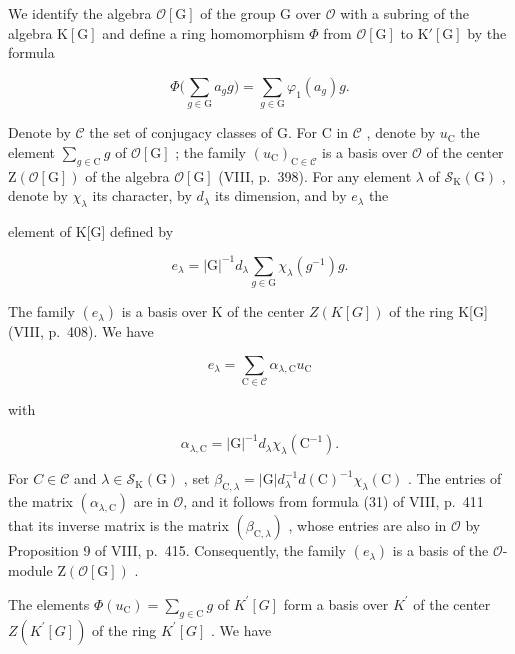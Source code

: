 We identify the algebra \(\mathcal{O}[\mathrm{G}]\) of the group \(\mathrm{G}\) over \(\mathcal{O}\) with a subring of the algebra \(\mathrm{K}[\mathrm{G}]\) and define a ring homomorphism \(\Phi\) from \(\mathcal{O}[\mathrm{G}]\) to \(\mathrm{K}'[\mathrm{G}]\) by the formula

\[
\Phi \bigg (\sum_ {g \in \mathrm{G}} a _ {g} g \bigg) = \sum_ {g \in \mathrm{G}} \varphi_ {1} (a _ {g}) g.\tag{42}
\]

Denote by \(\mathcal{C}\) the set of conjugacy classes of G. For C in \(\mathcal{C}\) , denote by \(u_{\mathrm{C}}\) the element \(\sum_{g\in \mathrm{C}}g\) of \(\mathcal{O}[\mathrm{G}]\) ; the family \((u_{\mathrm{C}})_{\mathrm{C}\in \mathcal{C}}\) is a basis over \(\mathcal{O}\) of the center \(\mathrm{Z}(\mathcal{O}[\mathrm{G}])\) of the algebra \(\mathcal{O}[\mathrm{G}]\) (VIII, p.~398). For any element \(\lambda\) of \(\mathcal{S}_{\mathrm{K}}(\mathrm{G})\) , denote by \(\chi_{\lambda}\) its character, by \(d_{\lambda}\) its dimension, and by \(e_{\lambda}\) the

element of K{[}G{]} defined by

\[
e _ {\lambda} = | \mathrm{G} | ^ {- 1} d _ {\lambda} \sum_ {g \in \mathrm{G}} \chi_ {\lambda} (g ^ {- 1}) g.\tag{43}
\]

The family \((e_{\lambda})\) is a basis over K of the center \(Z(K[G])\) of the ring K{[}G{]} (VIII, p.~408). We have

\[
e _ {\lambda} = \sum_ {\mathrm{C} \in \mathcal {C}} \alpha_ {\lambda , \mathrm{C}} u _ {\mathrm{C}}\tag{44}
\]

with

\[
\alpha_ {\lambda , \mathrm{C}} = | \mathrm{G} | ^ {- 1} d _ {\lambda} \chi_ {\lambda} (\mathrm{C} ^ {- 1}).\tag{45}
\]

For \(C \in \mathcal{C}\) and \(\lambda \in \mathcal{S}_{\mathrm{K}}(\mathrm{G})\) , set \(\beta_{\mathrm{C},\lambda} = |\mathrm{G}| d_{\lambda}^{-1} d(\mathrm{C})^{-1} \chi_{\lambda}(\mathrm{C})\) . The entries of the matrix \((\alpha_{\lambda,\mathrm{C}})\) are in \(\mathcal{O}\), and it follows from formula (31) of VIII, p.~411 that its inverse matrix is the matrix \((\beta_{\mathrm{C},\lambda})\) , whose entries are also in \(\mathcal{O}\) by Proposition 9 of VIII, p.~415. Consequently, the family \((e_{\lambda})\) is a basis of the \(\mathcal{O}\)-module \(\mathrm{Z}(\mathcal{O}[\mathrm{G}])\) .

The elements \(\Phi(u_{\mathrm{C}}) = \sum_{g\in \mathrm{C}}g\) of \(K^{\prime}[G]\) form a basis over \(K^{\prime}\) of the center \(Z(K^{\prime}[G])\) of the ring \(K^{\prime}[G]\) . We have

